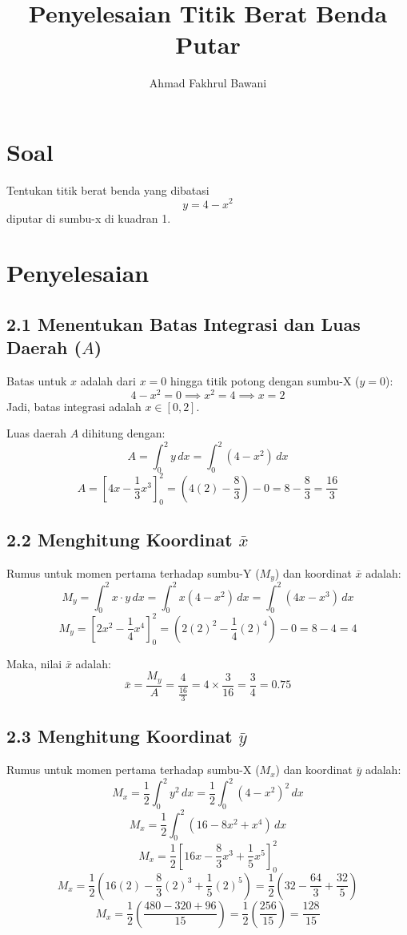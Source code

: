 \documentclass[12pt,a4paper]{article}
\title{Penyelesaian Titik Berat Benda Putar}
\author{Ahmad Fakhrul Bawani}
\date{}
\begin{document}
\maketitle

\section{Soal}
Tentukan titik berat benda yang dibatasi
\begin{equation}
  y = 4 - x^2
\end{equation}
diputar di sumbu-x di kuadran 1.

\section{Penyelesaian}

\subsection*{2.1 Menentukan Batas Integrasi dan Luas Daerah ($A$)}
Batas untuk $x$ adalah dari $x = 0$ hingga titik potong dengan sumbu-X ($y = 0$):
\[ 4 - x^2 = 0 \implies x^2 = 4 \implies x = 2 \]
Jadi, batas integrasi adalah $x \in [0, 2]$.

Luas daerah $A$ dihitung dengan:
\[ A = \int_{0}^{2} y \, dx = \int_{0}^{2} (4 - x^2) \, dx \]
\[ A = \left[ 4x - \frac{1}{3}x^3 \right]_{0}^{2} = \left( 4(2) - \frac{8}{3} \right) - 0 = 8 - \frac{8}{3} = \frac{16}{3} \]

\subsection*{2.2 Menghitung Koordinat $\bar{x}$}
Rumus untuk momen pertama terhadap sumbu-Y ($M_y$) dan koordinat $\bar{x}$ adalah:
\[ M_y = \int_{0}^{2} x \cdot y \, dx = \int_{0}^{2} x(4 - x^2) \, dx = \int_{0}^{2} (4x - x^3) \, dx \]
\[ M_y = \left[ 2x^2 - \frac{1}{4}x^4 \right]_{0}^{2} = \left( 2(2)^2 - \frac{1}{4}(2)^4 \right) - 0 = 8 - 4 = 4 \]

Maka, nilai $\bar{x}$ adalah:
\[ \bar{x} = \frac{M_y}{A} = \frac{4}{\frac{16}{3}} = 4 \times \frac{3}{16} = \frac{3}{4} = 0.75 \]

\subsection*{2.3 Menghitung Koordinat $\bar{y}$}
Rumus untuk momen pertama terhadap sumbu-X ($M_x$) dan koordinat $\bar{y}$ adalah:
\[ M_x = \frac{1}{2} \int_{0}^{2} y^2 \, dx = \frac{1}{2} \int_{0}^{2} (4 - x^2)^2 \, dx \]
\[ M_x = \frac{1}{2} \int_{0}^{2} (16 - 8x^2 + x^4) \, dx \]
\[ M_x = \frac{1}{2} \left[ 16x - \frac{8}{3}x^3 + \frac{1}{5}x^5 \right]_{0}^{2} \]
\[ M_x = \frac{1}{2} \left( 16(2) - \frac{8}{3}(2)^3 + \frac{1}{5}(2)^5 \right) = \frac{1}{2} \left( 32 - \frac{64}{3} + \frac{32}{5} \right) \]
\[ M_x = \frac{1}{2} \left( \frac{480 - 320 + 96}{15} \right) = \frac{1}{2} \left( \frac{256}{15} \right) = \frac{128}{15} \]
\end{document}
